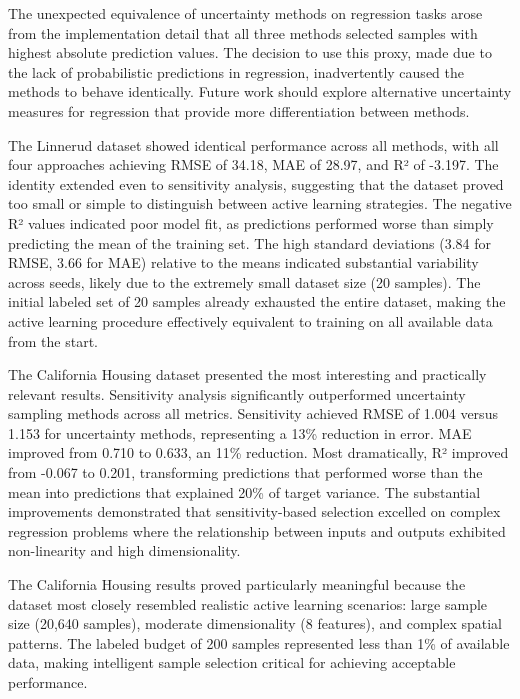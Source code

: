 \documentclass[conference]{IEEEtran}
\begin{document}
The unexpected equivalence of uncertainty methods on regression tasks arose from the implementation detail that all three methods selected samples with highest absolute prediction values. The decision to use this proxy, made due to the lack of probabilistic predictions in regression, inadvertently caused the methods to behave identically. Future work should explore alternative uncertainty measures for regression that provide more differentiation between methods.

The Linnerud dataset showed identical performance across all methods, with all four approaches achieving RMSE of 34.18, MAE of 28.97, and R² of -3.197. The identity extended even to sensitivity analysis, suggesting that the dataset proved too small or simple to distinguish between active learning strategies. The negative R² values indicated poor model fit, as predictions performed worse than simply predicting the mean of the training set. The high standard deviations (3.84 for RMSE, 3.66 for MAE) relative to the means indicated substantial variability across seeds, likely due to the extremely small dataset size (20 samples). The initial labeled set of 20 samples already exhausted the entire dataset, making the active learning procedure effectively equivalent to training on all available data from the start.

The California Housing dataset presented the most interesting and practically relevant results. Sensitivity analysis significantly outperformed uncertainty sampling methods across all metrics. Sensitivity achieved RMSE of 1.004 versus 1.153 for uncertainty methods, representing a 13\% reduction in error. MAE improved from 0.710 to 0.633, an 11\% reduction. Most dramatically, R² improved from -0.067 to 0.201, transforming predictions that performed worse than the mean into predictions that explained 20\% of target variance. The substantial improvements demonstrated that sensitivity-based selection excelled on complex regression problems where the relationship between inputs and outputs exhibited non-linearity and high dimensionality.

The California Housing results proved particularly meaningful because the dataset most closely resembled realistic active learning scenarios: large sample size (20,640 samples), moderate dimensionality (8 features), and complex spatial patterns. The labeled budget of 200 samples represented less than 1\% of available data, making intelligent sample selection critical for achieving acceptable performance.
\end{document}
